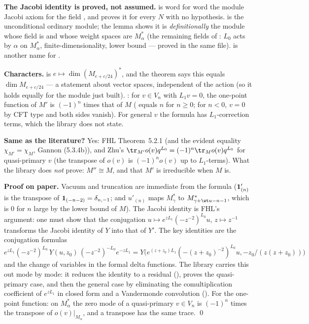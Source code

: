 \begin{dictionary}
\textbf{The Jacobi identity is proved, not assumed.}  is word for word the module
Jacobi axiom for the field , and  proves it for every $N$ with no
hypothesis.  is the unconditional ordinary module; the  lemma
\allowbreak{}\allowbreak{} shows it is \emph{definitionally} the module whose field is 
and whose weight spaces are $M_\alpha^*$ (the remaining fields of : $L_0$ acts by $\alpha$
on $M_\alpha^*$, finite-dimensionality, lower bound --- proved in the same file).
 is another name for .

\textbf{Characters.}  is $e\mapsto\dim(M_{e+c/24})^*$, and the theorem says this equals
$\dim M_{e+c/24}$ --- a statement about vector spaces, independent of the action (so it holds equally for the module just
built). \allowbreak{}\allowbreak{}: for $v\in V_n$ with $L_1v = 0$, the one-point function of $M'$ is
$(-1)^n$ times that of $M$ ( equals $n$ for $n\ge0$; for $n<0$, $v = 0$ by CFT type and both sides vanish).
For general $v$ the formula has $L_1$-correction terms, which the library does not state.

\textbf{Same as the literature?} Yes: FHL Theorem~5.2.1 (and the evident equality $\chi_{M'} = \chi_M$, Gannon (5.3.4b)), and Zhu's
$\tr_{M'}o(v)q^{L_0} = (-1)^n\tr_Mo(v)q^{L_0}$ for quasi-primary $v$ (the transpose of $o(v)$ is $(-1)^n o(v)$ up to
$L_1$-terms). What the library does \emph{not} prove: $M''\cong M$, and that $M'$ is irreducible when $M$ is.
\end{dictionary}

\textbf{Proof on paper.} Vacuum and truncation are immediate from the formula ($\mathbf{1}'_{(n)}$ is the transpose of
$\mathbf{1}_{(-n-2)} = \delta_{n,-1}$; and $u'_{(n)}$ maps $M_\gamma^*$ to $M^*_{\gamma+\wt u-n-1}$, which is $0$ for $n$ large by the
lower bound of $M$). The Jacobi identity is FHL's argument: one must show that the conjugation
$u\mapsto e^{zL_1}(-z^{-2})^{L_0}u$, $z\mapsto z^{-1}$ transforms the Jacobi identity of $Y$ into that of $Y'$. The key
identities are the conjugation formulas $e^{zL_1}(-z^{-2})^{L_0}\,Y(u,z_0)\,(-z^{-2})^{-L_0}e^{-zL_1} =
Y\big(e^{(z+z_0)L_1}(-(z+z_0)^{-2})^{L_0}u, -z_0/(z(z+z_0))\big)$ and the change of variables in the formal delta
functions. The library carries this out mode by mode: it reduces the identity to a residual (),
proves the quasi-primary case, and then the general case by eliminating the comultiplication coefficient of
$e^{zL_1}$ in closed form and a Vandermonde convolution (). For the one-point
function: on $M_\alpha^*$ the zero mode of a quasi-primary $v\in V_n$ is $(-1)^n$ times the transpose of $o(v)|_{M_\alpha}$,
and a transpose has the same trace. \qed

